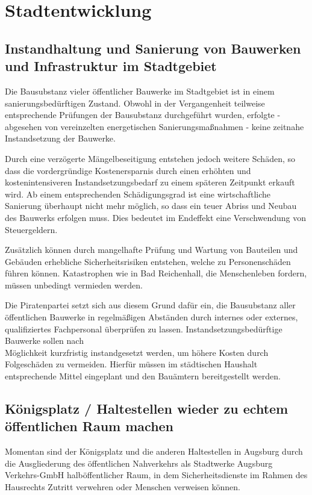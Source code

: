 \chapter{Stadtentwicklung}

  \section{Instandhaltung und Sanierung von Bauwerken und Infrastruktur im 
  Stadtgebiet}
  
  Die Bausubstanz vieler öffentlicher Bauwerke im Stadtgebiet ist in einem 
  sanierungsbedürftigen Zustand. Obwohl in der Vergangenheit teilweise 
  entsprechende Prüfungen der Bausubstanz durchgeführt wurden, erfolgte - 
  abgesehen von vereinzelten energetischen Sanierungsmaßnahmen - keine 
  zeitnahe Instandsetzung der Bauwerke.
  
  Durch eine verzögerte Mängelbeseitigung entstehen jedoch weitere Schäden, so 
  dass die vordergründige Kostenersparnis durch einen erhöhten und 
  kostenintensiveren Instandsetzungsbedarf zu einem späteren Zeitpunkt erkauft 
  wird. Ab einem entsprechenden Schädigungsgrad ist eine wirtschaftliche 
  Sanierung überhaupt nicht mehr möglich, so dass ein teuer Abriss und Neubau 
  des Bauwerks erfolgen muss. Dies bedeutet im Endeffekt eine Verschwendung 
  von Steuergeldern.
  
  Zusätzlich können durch mangelhafte Prüfung und Wartung von Bauteilen und 
  Gebäuden erhebliche Sicherheitsrisiken entstehen, welche zu Personenschäden 
  führen können. Katastrophen wie in Bad Reichenhall, die Menschenleben 
  fordern, müssen unbedingt vermieden werden.
  
  Die Piratenpartei setzt sich aus diesem Grund dafür ein, die Bausubstanz 
  aller öffentlichen Bauwerke in regelmäßigen Abständen durch internes oder 
  externes, qualifiziertes Fachpersonal überprüfen zu lassen. 
  Instandsetzungsbedürftige Bauwerke sollen nach\\ Möglichkeit kurzfristig 
  instandgesetzt werden, um höhere Kosten durch Folgeschäden zu vermeiden. 
  Hierfür müssen im städtischen Haushalt entsprechende Mittel eingeplant und 
  den Bauämtern bereitgestellt werden.
  
  \section{Königsplatz / Haltestellen wieder zu echtem öffentlichen Raum 
  machen}
  
  Momentan sind der Königsplatz und die anderen Haltestellen in Augsburg durch 
  die Ausgliederung des öffentlichen Nahverkehrs als Stadtwerke Augsburg 
  Verkehrs-GmbH halböffentlicher Raum, in dem Sicherheitsdienste im Rahmen des 
  Hausrechts Zutritt verwehren oder Menschen verweisen können.
  
